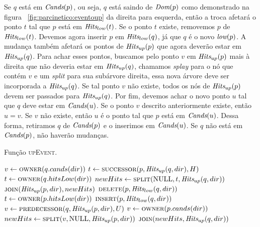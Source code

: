 Se $q$ está em $\textit{Cands}(p)$, ou seja, $q$ está saindo de $\textit{Dom}(p)$
como demonstrado na figura~ \ref{fig:parcinetico:eventoup} da
direita para esquerda, então a troca afetará o ponto $t$ tal que $p$
está em $\textit{Hits}_{low}(t)$. Se o ponto $t$ existe, removemos $p$ de
$\textit{Hits}_{low}(t)$. Devemos agora inserir $p$ em $\textit{Hits}_{low}(q)$, já
que $q$ é o novo $\textit{low}(p)$. A mudança também afetará os pontos de
$\textit{Hits}_{up}(p)$ que agora deverão estar em $\textit{Hits}_{up}(q)$. Para
achar esses pontos, buscamos pelo ponto $v$ em $\textit{Hits}_{up}(p)$ mais
à direita que não deveria estar em $\textit{Hits}_{up}(q)$, chamamos
\textit{splay} para o nó que contém $v$ e um \textit{split} para sua
subárvore direita, essa nova árvore deve ser incorporada a
$\textit{Hits}_{up}(q)$. Se tal ponto $v$ não existe, todos os nós de
$\textit{Hits}_{up}(p)$ devem ser passados para $\textit{Hits}_{up}(q)$. Por fim,
devemos achar o novo ponto $u$ tal que $q$ deve estar em
$\textit{Cands}(u)$. Se o ponto $v$ descrito anteriormente existe, então $u
= v$. Se $v$ não existe, então $u$ é o ponto tal que $p$ está em
$\textit{Cands}(u)$. Dessa forma, retiramos $q$ de $\textit{Cands}(p)$ e o inserimos
em $\textit{Cands}(u)$. Se $q$ não está em $\textit{Cands}(p)$, não haverão
mudanças.
\begin{algorithm}[h]
    \caption{Função \textsc{upEvent}.}
    \label{parcinetico:eventoup}
\begin{algorithmic}[1]
            \State $v \leftarrow \Call{owner}{q.cands(dir)}$
                \State {}
            \EndIf
            \State {}
            \State $t \leftarrow \Call{successor}{p, \Hits_{up}(q, dir), H}$
                \State $t \leftarrow \Call{owner}{q.hitsLow(dir)}$
            \EndIf
            \State $newHits \leftarrow \Call{split}{\Null, t, \Hits_{up}(q, dir)}$
            \State $\Call{join}{\Hits_{up}(p, dir), newHits}$
            \State $\Call{delete}{p, \Hits_{low}(q, dir)}$
                \State {}
            \EndIf
        \Else
                \State $t \leftarrow \Call{owner}{p.hitsLow(dir)}$
                    \State {}
                \EndIf
                \State $\Call{insert}{p, \Hits_{low}(q, dir)}$
                \State $v \leftarrow \Call{predecessor}{q, \Hits_{up}(p, dir), U}$
                    \State $v \leftarrow \Call{owner}{p.cands(dir)}$
                \EndIf
                \State $newHits \leftarrow \Call{split}{v, \Null, \Hits_{up}(p,dir)}$
                \State $\Call{join}{newHits, \Hits_{up}(q, dir)}$
                \State {}
                    \State {}
                \EndIf
            \EndIf
        \EndIf
    \EndFunction
\end{algorithmic}
\end{algorithm}
